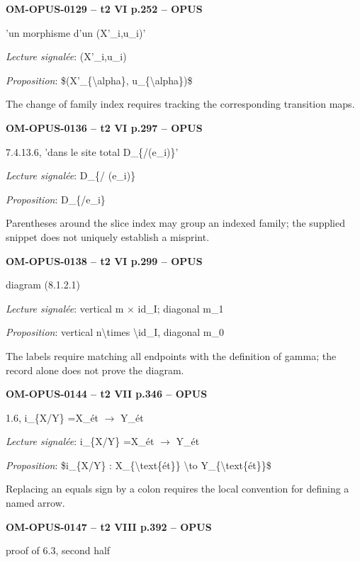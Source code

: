 \par\noindent\textbf{OM-OPUS-0129 -- t2 VI p.252 -- OPUS}\par
'un morphisme d'un (X'\_i,u\_i)'\par
\emph{Lecture signalée}: (X'\_i,u\_i)\par
\emph{Proposition}: \$(X'\_\{\textbackslash{}alpha\}, u\_\{\textbackslash{}alpha\})\$\par
The change of family index requires tracking the corresponding transition maps.\par
\par\noindent\textbf{OM-OPUS-0136 -- t2 VI p.297 -- OPUS}\par
7.4.13.6, 'dans le site total D\_\{/(e\_i)\}'\par
\emph{Lecture signalée}: D\_\{/ (e\_i)\}\par
\emph{Proposition}: D\_\{/e\_i\}\par
Parentheses around the slice index may group an indexed family; the supplied snippet does not uniquely establish a misprint.\par
\par\noindent\textbf{OM-OPUS-0138 -- t2 VI p.299 -- OPUS}\par
diagram (8.1.2.1)\par
\emph{Lecture signalée}: vertical m \ensuremath{\times} id\_I; diagonal m\_1\par
\emph{Proposition}: vertical n\textbackslash{}times \textbackslash{}id\_I, diagonal m\_0\par
The labels require matching all endpoints with the definition of gamma; the record alone does not prove the diagram.\par
\par\noindent\textbf{OM-OPUS-0144 -- t2 VII p.346 -- OPUS}\par
1.6, i\_\{X/Y\} =\allowbreak  X\_ét \ensuremath{\to} Y\_ét\par
\emph{Lecture signalée}: i\_\{X/Y\} =\allowbreak  X\_ét \ensuremath{\to} Y\_ét\par
\emph{Proposition}: \$i\_\{X/Y\} : X\_\{\textbackslash{}text\{ét\}\} \textbackslash{}to Y\_\{\textbackslash{}text\{ét\}\}\$\par
Replacing an equals sign by a colon requires the local convention for defining a named arrow.\par
\par\noindent\textbf{OM-OPUS-0147 -- t2 VIII p.392 -- OPUS}\par
proof of 6.3, second half\par
